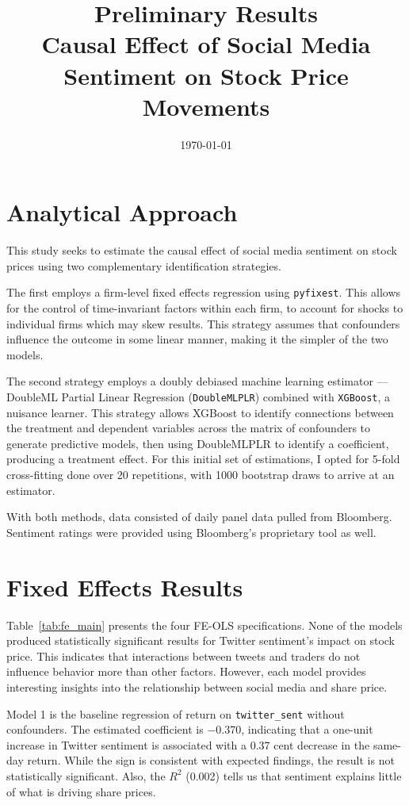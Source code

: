\documentclass[12pt]{article}
\title{Preliminary Results\\
\large Causal Effect of Social Media Sentiment on Stock Price Movements}
\date{\today}
\begin{document}
\maketitle

\section{Analytical Approach}

This study seeks to estimate the causal effect of social media sentiment on stock prices using two complementary identification strategies.

The first employs a firm-level fixed effects regression using \texttt{pyfixest}. This allows for the control of time-invariant factors within each firm, to account for shocks to individual firms which may skew results. This strategy assumes that confounders influence the outcome in some linear manner, making it the simpler of the two models.

The second strategy employs a doubly debiased machine learning estimator --- DoubleML Partial Linear Regression (\texttt{DoubleMLPLR}) combined with \texttt{XGBoost}, a nuisance learner. This strategy allows XGBoost to identify connections between the treatment and dependent variables across the matrix of confounders to generate predictive models, then using DoubleMLPLR to identify a coefficient, producing a treatment effect. For this initial set of estimations, I opted for 5-fold cross-fitting done over 20 repetitions, with 1000 bootstrap draws to arrive at an estimator.

With both methods, data consisted of daily panel data pulled from Bloomberg. Sentiment ratings were provided using Bloomberg's proprietary tool as well.

\newpage
\section{Fixed Effects Results}

Table~\ref{tab:fe_main} presents the four FE-OLS specifications. None of the models produced statistically significant results for Twitter sentiment's impact on stock price. This indicates that interactions between tweets and traders do not influence behavior more than other factors. However, each model provides interesting insights into the relationship between social media and share price.

Model 1 is the baseline regression of return on \texttt{twitter\_sent} without confounders. The estimated coefficient is $-$0.370, indicating that a one-unit increase in Twitter sentiment is associated with a 0.37 cent decrease in the same-day return. While the sign is consistent with expected findings, the result is not statistically significant. Also, the $R^2$ (0.002) tells us that sentiment explains little of what is driving share prices.
\end{document}

